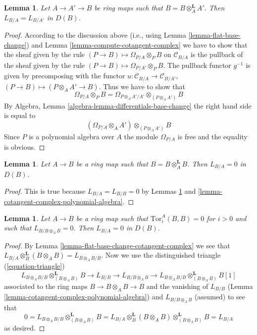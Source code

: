 \documentclass{stacks-project}
\theoremstyle{plain}
\newtheorem{lemma}[subsection]{Lemma}
\theoremstyle{definition}
\theoremstyle{remark}
\numberwithin{equation}{subsection}
\begin{document}
\begin{lemma}
\label{lemma-localize-at-bottom}
Let $A \to A' \to B$ be ring maps such that $B = B \otimes_A^\mathbf{L} A'$.
Then $L_{B/A} = L_{B/A'}$ in $D(B)$.
\end{lemma}

\begin{proof}
According to the discussion above (i.e., using
Lemma \ref{lemma-flat-base-change})
and Lemma \ref{lemma-compute-cotangent-complex}
we have to show that the sheaf given
by the rule $(P \to B) \mapsto \Omega_{P/A} \otimes_P B$ on $\mathcal{C}_{B/A}$
is the pullback of the sheaf given by the rule
$(P \to B) \mapsto \Omega_{P/A'} \otimes_P B$.
The pullback functor $g^{-1}$ is given by precomposing with the
functor $u : \mathcal{C}_{B/A} \to \mathcal{C}_{B/A'}$,
$(P \to B) \mapsto (P \otimes_A A' \to B)$.
Thus we have to show that
$$
\Omega_{P/A} \otimes_P B =
\Omega_{P \otimes_A A'/A'} \otimes_{(P \otimes_A A')} B
$$
By Algebra, Lemma \ref{algebra-lemma-differentials-base-change}
the right hand side is equal to
$$
(\Omega_{P/A} \otimes_A A') \otimes_{(P \otimes_A A')} B
$$
Since $P$ is a polynomial algebra over $A$ the module
$\Omega_{P/A}$ is free and the equality is obvious.
\end{proof}

\begin{lemma}
\label{lemma-derived-diagonal}
Let $A \to B$ be a ring map such that $B = B \otimes_A^\mathbf{L} B$.
Then $L_{B/A} = 0$ in $D(B)$.
\end{lemma}

\begin{proof}
This is true because $L_{B/A} = L_{B/B} = 0$ by
Lemmas \ref{lemma-localize-at-bottom} and
\ref{lemma-cotangent-complex-polynomial-algebra}.
\end{proof}

\begin{lemma}
\label{lemma-bootstrap}
Let $A \to B$ be a ring map such that $\text{Tor}^A_i(B, B) = 0$ for $i > 0$
and such that $L_{B/B \otimes_A B} = 0$.
Then $L_{B/A} = 0$ in $D(B)$.
\end{lemma}

\begin{proof}
By Lemma \ref{lemma-flat-base-change-cotangent-complex} we see that
$L_{B/A} \otimes_B^\mathbf{L} (B \otimes_A B) = L_{B \otimes_A B/B}$.
Now we use the distinguished triangle (\ref{equation-triangle})
$$
L_{B \otimes_A B/B} \otimes^\mathbf{L}_{(B \otimes_A B)} B \to
L_{B/B} \to L_{B/B \otimes_A B} \to
L_{B \otimes_A B/B} \otimes^\mathbf{L}_{(B \otimes_A B)} B[1]
$$
associated to the ring maps $B \to B \otimes_A B \to B$ and the vanishing of
$L_{B/B}$ (Lemma \ref{lemma-cotangent-complex-polynomial-algebra}) and
$L_{B/B \otimes_A B}$ (assumed) to see that
$$
0 =
L_{B \otimes_A B/B} \otimes^\mathbf{L}_{(B \otimes_A B)} B =
L_{B/A} \otimes_B^\mathbf{L} (B \otimes_A B)
\otimes^\mathbf{L}_{(B \otimes_A B)} B = L_{B/A}
$$
as desired.
\end{proof}
\end{document}
